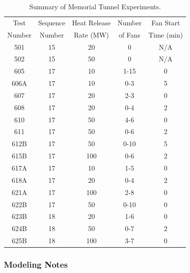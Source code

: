 \begin{table}[!ht]
\centering
\caption[Summary of Memorial Tunnel Experiments]{Summary of Memorial Tunnel Experiments.}
\begin{tabular}{|c|c|c|c|c|}
\hline
Test     & Sequence & Heat Release  & Number   & Fan Start   \\
Number   & Number   & Rate (MW)     & of Fans  & Time (min)  \\ \hline \hline
501      & 15       & 20            & 0        & N/A         \\ \hline
502      & 15       & 50            & 0        & N/A         \\ \hline
605      & 17       & 10            & 1-15     & 0           \\ \hline
606A     & 17       & 10            & 0-3      & 5           \\ \hline
607      & 17       & 20            & 2-3      & 0           \\ \hline
608      & 17       & 20            & 0-4      & 2           \\ \hline
610      & 17       & 50            & 4-6      & 0           \\ \hline
611      & 17       & 50            & 0-6      & 2           \\ \hline
612B     & 17       & 50            & 0-10     & 5           \\ \hline
615B     & 17       & 100           & 0-6      & 2           \\ \hline
617A     & 17       & 10            & 1-5      & 0           \\ \hline
618A     & 17       & 20            & 0-4      & 2           \\ \hline
621A     & 17       & 100           & 2-8      & 0           \\ \hline
622B     & 17       & 50            & 0-10     & 0           \\ \hline
623B     & 18       & 20            & 1-6      & 0           \\ \hline
624B     & 18       & 50            & 0-7      & 2           \\ \hline
625B     & 18       & 100           & 3-7      & 0           \\ \hline
\end{tabular}
\label{tab:Memorial_Test_Matrix}
\end{table}


\subsubsection{Modeling Notes}

